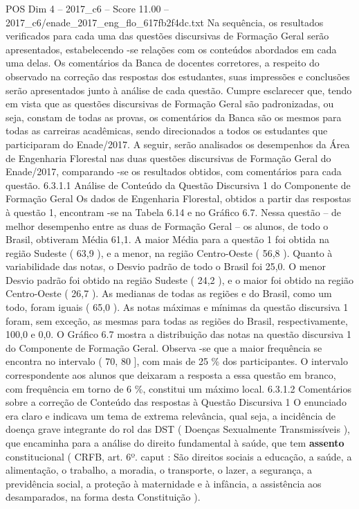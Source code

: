 \begin{textsample}{POS Dim 4 – 2017\_c6 – Score 11.00 – 2017\_c6/enade\_2017\_eng\_flo\_617fb2f4dc.txt}
Na sequência, os resultados verificados para cada uma das questões discursivas de Formação Geral serão apresentados, estabelecendo -se relações com os conteúdos abordados em cada uma delas.
Os comentários da Banca de docentes corretores, a respeito do observado na correção das respostas dos estudantes, suas impressões e conclusões serão apresentados junto à análise de cada questão.
Cumpre esclarecer que, tendo em vista que as questões discursivas de Formação Geral são padronizadas, ou seja, constam de todas as provas, os comentários da Banca são os mesmos para todas as carreiras acadêmicas, sendo direcionados a todos os estudantes que participaram do Enade/2017.
A seguir, serão analisados os desempenhos da Área de Engenharia Florestal nas duas questões discursivas de Formação Geral do Enade/2017, comparando -se os resultados obtidos, com comentários para cada questão. 6.3.1.1 Análise de Conteúdo da Questão Discursiva 1 do Componente de Formação Geral Os dados de Engenharia Florestal, obtidos a partir das respostas à questão 1, encontram -se na Tabela 6.14 e no Gráfico 6.7.
Nessa questão – de melhor desempenho entre as duas de Formação Geral – os alunos, de todo o Brasil, obtiveram Média 61,1.
A maior Média para a questão 1 foi obtida na região Sudeste ( 63,9 ), e a menor, na região Centro-Oeste ( 56,8 ).
Quanto à variabilidade das notas, o Desvio padrão de todo o Brasil foi 25,0.
O menor Desvio padrão foi obtido na região Sudeste ( 24,2 ), e o maior foi obtido na região Centro-Oeste ( 26,7 ).
As medianas de todas as regiões e do Brasil, como um todo, foram iguais ( 65,0 ).
As notas máximas e mínimas da questão discursiva 1 foram, sem exceção, as mesmas para todas as regiões do Brasil, respectivamente, 100,0 e 0,0.
O Gráfico 6.7 mostra a distribuição das notas na questão discursiva 1 do Componente de Formação Geral.
Observa -se que a maior frequência se encontra no intervalo ( 70, 80 ], com mais de 25 \% dos participantes.
O intervalo correspondente aos alunos que deixaram a resposta a essa questão em branco, com frequência em torno de 6 \%, constitui um máximo local. 6.3.1.2 Comentários sobre a correção de Conteúdo das respostas à Questão Discursiva 1 O enunciado era claro e indicava um tema de extrema relevância, qual seja, a incidência de doença grave integrante do rol das DST ( Doenças Sexualmente Transmissíveis ), que encaminha para a análise do direito fundamental à saúde, que tem \textbf{assento} constitucional ( CRFB, art. 6º. caput : São direitos sociais a educação, a saúde, a alimentação, o trabalho, a moradia, o transporte, o lazer, a segurança, a previdência social, a proteção à maternidade e à infância, a assistência aos desamparados, na forma desta Constituição ).

\end{textsample}
